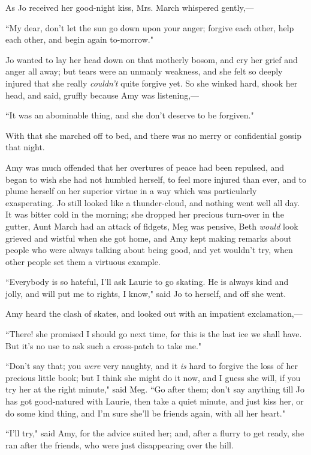 As Jo received her good-night kiss, Mrs. March whispered gently,---

``My dear, don't let the sun go down upon your anger;
forgive each other, help each other, and begin again to-morrow."

Jo wanted to lay her head down on that motherly bosom, and cry her grief
and anger all away; but tears were an unmanly weakness, and she felt so
deeply injured that she really \emph{couldn't} quite
forgive yet. So she winked hard, shook her head, and said, gruffly
because Amy was listening,---

``It was an abominable thing, and she don't deserve to be
forgiven."

With that she marched off to bed, and there was no merry or confidential
gossip that night.

Amy was much offended that her overtures of peace had been repulsed, and
began to wish she had not humbled herself, to feel more injured than
ever, and to plume herself on her superior virtue in a way which was
particularly exasperating. Jo still looked like a thunder-cloud, and
nothing went well all day. It was bitter cold in the morning; she
dropped her precious turn-over in the gutter, Aunt March had an attack
of fidgets, Meg was pensive, Beth \emph{would} look grieved and wistful
when she got home, and Amy kept making remarks about people who were
always talking about being good, and yet wouldn't try,
when other people set them a virtuous example.

``Everybody is so hateful, I'll ask Laurie to go skating.
He is always kind and jolly, and will put me to rights, I know," said Jo
to herself, and off she went.

Amy heard the clash of skates, and looked out with an impatient
exclamation,---

``There! she promised I should go next time, for this is the last ice we
shall have. But it's no use to ask such a cross-patch to
take me."

``Don't say that; you \emph{were} very naughty, and it
\emph{is} hard to forgive the loss of her precious little book; but I
think she might do it now, and I guess she will, if you try her at the
right minute," said Meg. ``Go after them; don't say
anything till Jo has got good-natured with Laurie, then take a quiet
minute, and just kiss her, or do some kind thing, and
I'm sure she'll be friends again, with
all her heart."

``I'll try," said Amy, for the advice suited her; and,
after a flurry to get ready, she ran after the friends, who were just
disappearing over the hill.

